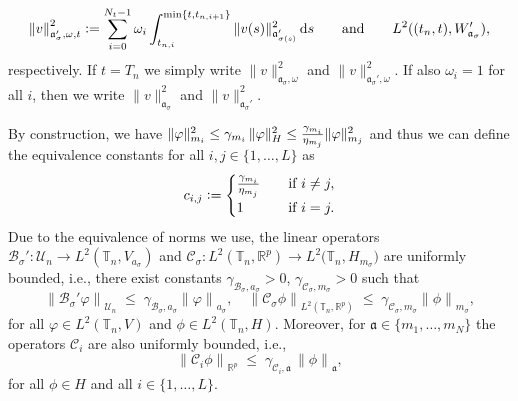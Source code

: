 \documentclass[reqno]{amsart}
\newcommand{\U}{{\mathscr U}}
\newcommand{\R}{\mathbb R}
\newcommand{\timeInt}{\mathbb{T}}
\newcommand{\outVarDim}{p}
\newcommand{\ds}{\,\mathrm{d}s}
\newcommand{\coerMi}[1]{\eta_{m_{#1}}}
\newcommand{\contMi}[1]{\gamma_{m_{#1}}}
\newcommand{\bOper}{\calB}
\newcommand{\cOper}{\calC}
\newcommand{\switch}{\sigma}
\newcommand{\nrModes}{L}
\newcommand{\nrSwitches}{N}
\newcommand{\calB}{\mathcal{B}}
\newcommand{\calC}{\mathcal{C}}
\begin{document}
\begin{definition}
    \begin{equation}\label{eqn:dualsiwtchnorm}
        {\|v\|}_{\mathfrak{a}_\switch', \omega,t}^2\vcentcolon= 
        \sum\limits_{i=0}^{N_t-1}\omega_i\int_{t_{n,i}}^{\min\{t,t_{n,i+1}\}}\|v(s)\|^2_{\mathfrak{a}_{\switch(s)}'} \ds \qquad \text{and} \qquad L^2((t_n,t), W'_{\mathfrak{a}_{\switch}}),
    \end{equation}
    respectively.
    If $t=T_n$ we simply write $ \|v\|_{\mathfrak{a}_\switch,\omega}^2$ and  $\|v\|_{\mathfrak{a}_\switch',\omega}^2$. If also $\omega_i = 1$ for all $i$, then we write $ \|v\|_{\mathfrak{a}_\switch}^2$ and  $\|v\|_{\mathfrak{a}_\switch'}^2$. 
\end{definition}
% 
By construction, we have $\|\varphi\|_{m_i}^2 \leq \contMi{i}\,\|\varphi\|_H^2 \leq\smash{\tfrac{\contMi{i}}{\coerMi{j}}}\|\varphi\|_{m_j}^2$ 
and thus we can define the equivalence constants for all $i,j\in \{1,\ldots,\nrModes\}$ as
\begin{align}
    \label{eqn:def:cij}
    c_{i,j} \vcentcolon= \begin{cases}
            \tfrac{\contMi{i}}{\coerMi{j}} &\quad\text{if }i\neq j,\\
            1&\quad\text{if }i=j.
        \end{cases}
\end{align}
%
Due to the equivalence of norms we use, the linear operators $\bOper_{\switch}':\U_n\to L^2(\timeInt_n, V_{a_\switch}) $ and $\cOper_{\switch}:{L^2(\timeInt_n,\R^{\outVarDim})} \to {L^2(\timeInt_n, H_{m_\switch}})$ are uniformly bounded, i.e., there exist constants $\gamma_{\bOper_{\switch},{a}_{\switch}}>0$, $\gamma_{\cOper_{\switch},{m}_{\switch}}>0$ such that
%
    \begin{equation}
        \label{eqn:properties:c:en:norm2}
        {\|\bOper_{\switch}'\varphi\|}_{\U_n}\; \leq\; \gamma_{\bOper_{\switch},{a}_{\switch}}{\|\varphi\|}_{{a}_{\switch}},\quad{\|\cOper_{\switch}\phi\|}_{L^2(\timeInt_n,\R^{\outVarDim})}\; \leq\; \gamma_{\cOper_{\switch},{m}_{\switch}} {\|\phi\|}_{{m}_{\switch}},
    \end{equation}
%
for all $\varphi\in L^2(\timeInt_n,V)$ and $\phi\in L^2(\timeInt_n,H)$. Moreover, for $\mathfrak{a}\in\{m_1,\ldots,m_{\nrSwitches}\}$ the operators $\cOper_i$ are also uniformly bounded, i.e.,
%
    \begin{equation}
            \label{eqn:properties:c:enrgy:norm}
            {\|\cOper_i\phi\|}_{\R^{\outVarDim}} \;\leq\; \gamma_{\cOper_i,\mathfrak{a}}\,{\|\phi\|}_{\mathfrak{a}},
    \end{equation}
%
for all $\phi\in H$ and all $i\in \{1,\ldots,\nrModes\}$.
%
\end{document}
